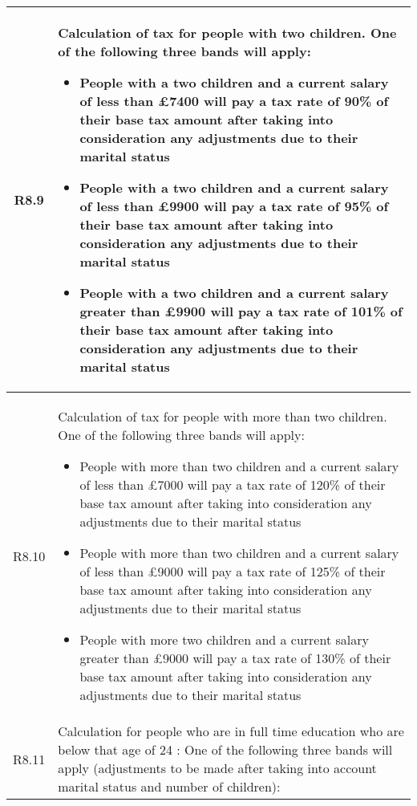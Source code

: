 \begin{table}[H]
\small
\centering
\begin{tabularx}{\textwidth}{| c | X |}
    \hline %
    R8.9 & Calculation of tax for people with two children. One of the following three bands will apply:
    \begin{itemize}[itemsep=\tableitemsep, leftmargin=\tableleftsep]
        \item People with a two children and a current salary of less than £7400 will pay a tax rate of 90\% of their base tax amount after taking into consideration any adjustments due to their marital status
        \item People with a two children and a current salary of less than £9900 will pay a tax rate of 95\% of their base tax amount after taking into consideration any adjustments due to their marital status
        \item People with a two children and a current salary greater than £9900 will pay a tax rate of 101\% of their base tax amount after taking into consideration any adjustments due to their marital status
    \end{itemize}
    \\
    \hline %
    R8.10 & Calculation of tax for people with more than two children. One of the following three bands will apply:
    \begin{itemize}[itemsep=\tableitemsep, leftmargin=\tableleftsep]
        \item People with more than two children and a current salary of less than £7000 will pay a tax rate of 120\% of their base tax amount after taking into consideration any adjustments due to their marital status
        \item People with more than two children and a current salary of less than £9000 will pay a tax rate of 125\% of their base tax amount after taking into consideration any adjustments due to their marital status
        \item People with more two children and a current salary greater than £9000 will pay a tax rate of 130\% of their base tax amount after taking into consideration any adjustments due to their marital status
    \end{itemize}
    \\
    \hline %
    R8.11 & Calculation for people who are in full time education who are below that age of 24 : One of the following three bands will apply (adjustments to be made after taking into account marital status and number of children):

\end{tabularx}
\end{table}

